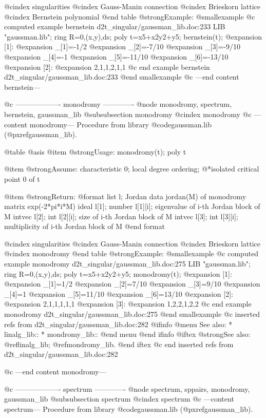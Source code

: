 @cindex singularities
@cindex Gauss-Manin connection
@cindex Brieskorn lattice
@cindex Bernstein polynomial
@end table
@strong{Example:}
@smallexample
@c computed example bernstein d2t_singular/gaussman_lib.doc:233 
LIB "gaussman.lib";
ring R=0,(x,y),ds;
poly t=x5+x2y2+y5;
bernstein(t);
@expansion{} [1]:
@expansion{}    _[1]=-1/2
@expansion{}    _[2]=-7/10
@expansion{}    _[3]=-9/10
@expansion{}    _[4]=-1
@expansion{}    _[5]=-11/10
@expansion{}    _[6]=-13/10
@expansion{} [2]:
@expansion{}    2,1,1,2,1,1
@c end example bernstein d2t_singular/gaussman_lib.doc:233
@end smallexample
@c ---end content bernstein---

@c ------------------- monodromy -------------
@node monodromy, spectrum, bernstein, gaussman_lib
@subsubsection monodromy
@cindex monodromy
@c ---content monodromy---
Procedure from library @code{gaussman.lib} (@pxref{gaussman_lib}).

@table @asis
@item @strong{Usage:}
monodromy(t); poly t

@item @strong{Assume:}
characteristic 0; local degree ordering;
@*isolated critical point 0 of t

@item @strong{Return:}
@format
list l;  Jordan data jordan(M) of monodromy matrix exp(-2*pi*i*M)
  ideal l[1]; 
    number l[1][i];  eigenvalue of i-th Jordan block of M
  intvec l[2]; 
    int l[2][i];  size of i-th Jordan block of M
  intvec l[3]; 
    int l[3][i];  multiplicity of i-th Jordan block of M
@end format

@cindex singularities
@cindex Gauss-Manin connection
@cindex Brieskorn lattice
@cindex monodromy
@end table
@strong{Example:}
@smallexample
@c computed example monodromy d2t_singular/gaussman_lib.doc:275 
LIB "gaussman.lib";
ring R=0,(x,y),ds;
poly t=x5+x2y2+y5;
monodromy(t);
@expansion{} [1]:
@expansion{}    _[1]=1/2
@expansion{}    _[2]=7/10
@expansion{}    _[3]=9/10
@expansion{}    _[4]=1
@expansion{}    _[5]=11/10
@expansion{}    _[6]=13/10
@expansion{} [2]:
@expansion{}    2,1,1,1,1,1
@expansion{} [3]:
@expansion{}    1,2,2,1,2,2
@c end example monodromy d2t_singular/gaussman_lib.doc:275
@end smallexample
@c inserted refs from d2t_singular/gaussman_lib.doc:282
@ifinfo
@menu
See also:
* linalg_lib::
* mondromy_lib::
@end menu
@end ifinfo
@iftex
@strong{See also:}
@ref{linalg_lib};
@ref{mondromy_lib}.
@end iftex
@c end inserted refs from d2t_singular/gaussman_lib.doc:282

@c ---end content monodromy---

@c ------------------- spectrum -------------
@node spectrum, sppairs, monodromy, gaussman_lib
@subsubsection spectrum
@cindex spectrum
@c ---content spectrum---
Procedure from library @code{gaussman.lib} (@pxref{gaussman_lib}).

